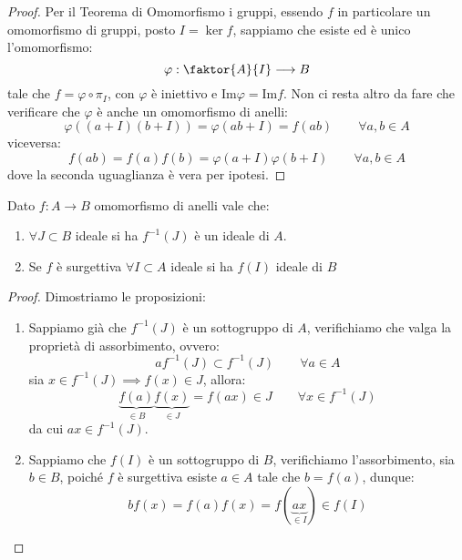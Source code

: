\documentclass[11pt]{scrartcl}
\begin{document}
\begin{proof}
    Per il Teorema di Omomorfismo i gruppi, essendo $f$ in particolare un omomorfismo di gruppi, posto $I = \ker f$, sappiamo che
    esiste ed è unico l'omomorfismo:
        \[ \varphi : \faktor{A}{I} \longrightarrow B
            \]
    tale che $f = \varphi \circ \pi_I$, con $\varphi$ è iniettivo e $\text{Im} \varphi = \text{Im} f$. Non ci resta altro da fare che verificare che $\varphi$ è 
    anche un omomorfismo di anelli:
        \[ \varphi((a+I)(b+I)) = \varphi(ab+I) = f(ab) \qquad \forall a,b \in A
            \]
    viceversa:
        \[ f(ab) = f(a)f(b) = \varphi(a+I)\varphi(b+I) \qquad \forall a,b \in A
            \]
    dove la seconda uguaglianza è vera per ipotesi.
\end{proof}

\begin{lemma}
    \label{2.35}
    Dato $f : A \longrightarrow B$ omomorfismo di anelli vale che:
    \begin{enumerate}[(1)]
        \item $\forall J \subset B$ ideale si ha $f^{-1}(J)$ è un ideale di $A$.
        \item Se $f$ è surgettiva $\forall I \subset A$ ideale si ha $f(I)$ ideale di $B$
    \end{enumerate}
\end{lemma}

\begin{proof}
    Dimostriamo le proposizioni:
    \begin{enumerate}[(1)]
        \item Sappiamo già che $f^{-1}(J)$ è un sottogruppo di $A$, verifichiamo che valga la proprietà di assorbimento, ovvero:
            \[ af^{-1}(J) \subset f^{-1}(J) \qquad \forall a \in A
                \]
            sia $x \in f^{-1}(J) \implies f(x) \in J$, allora:
            \[ \underbrace{f(a)}_{\in B}\underbrace{f(x)}_{\in J} = f(ax) \in J \qquad \forall x \in f^{-1}(J)
                \]
            da cui $ax \in f^{-1}(J)$.
        \item Sappiamo che $f(I)$ è un sottogruppo di $B$, verifichiamo l'assorbimento, sia $b \in B$, poiché $f$ è surgettiva esiste $a \in A$ tale che $b = f(a)$, dunque:
            \[ bf(x) = f(a)f(x) = f(\underbrace{ax}_{\in I}) \in f(I)
                \]
    \end{enumerate}
\end{proof}
\end{document}
